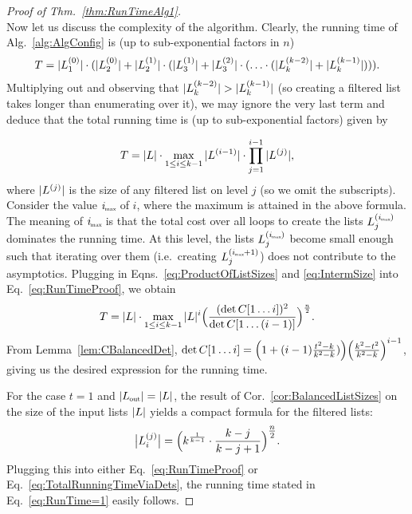 \begin{proof}[Proof of Thm.~\ref{thm:RunTimeAlg1}]
\begin{equation}
  \end{equation}
Now let us discuss the complexity of the algorithm. Clearly, the running time of Alg.~\ref{alg:AlgConfig} is (up to sub-exponential factors in $n$) 
\begin{align*}
   T = |L_1^{(0)}| \cdot (|L_2^{(0)}| + |L_2^{(1)}| \cdot (|L_3^{(1)}| +|L_3^{(2)}| \cdot(\ldots \cdot (|L_k^{(k-2)}| + |L_k^{(k-1)}| ) )).
\end{align*}  
Multiplying out and observing that $\normalabs{L_k^{(k-2)}}>\normalabs{L_k^{(k-1)}}$ (so creating a filtered list takes longer than enumerating over it), we may ignore the very last term and deduce that the total running time is (up to sub-exponential factors) given by

  \begin{equation} \label{eq:RunTimeProof}
  	T =  \left|L\right| \cdot \max\limits_{1 \leq i \leq k-1}  |L^{(i-1)}| \cdot \prod_{j=1}^{i-1} |L^{(j)}|,
  \end{equation}
  where $|L^{(j)}|$ is the size of any filtered list on level $j$ (so we omit the subscripts). Consider the value $\im$ of $i$, where the maximum is attained in the above formula. The meaning of $\im$ is that the total cost over all loops to create the lists $L_j^{(\im)}$ dominates the running time. At this level, the lists $L_j^{(\im)}$ become small enough such that iterating over them (i.e.\ creating $L_j^{(\im+1)}$) does not contribute to the asymptotics. Plugging in Eqns.~\eqref{eq:ProductOfListSizes} and \eqref{eq:IntermSize} into Eq.~\eqref{eq:RunTimeProof}, we obtain
  \vspace{-1ex}
  \begin{equation}\label{eq:TotalRunningTimeViaDets}
    T=\left|L\right|\cdot \max\limits_{1\le i \leq k-1} |L|^i \Bigl( \frac{(\det C[1\ldots i])^2}{\det C[1\ldots (i-1)]}\Bigr)^{\frac{n}{2}}.
  \end{equation}
  From Lemma~\ref{lem:CBalancedDet}, $\det C[1\ldots i] = \Bigl( 1 + (i-1)\frac{t^2-k}{k^2-k})\Bigr) \Bigl( \frac{k^2-t^2}{k^2-k} \Bigr)^{i-1}$, giving us the desired expression for the running time.
  
  For the case $t=1$ and $\normalabs{\Lout} = \normalabs{L}$, the result of Cor.~\ref{cor:BalancedListSizes} on the size of the input lists $\left|L\right|$ yields a compact formula for the filtered lists:
    \vspace{-1ex}
    \begin{equation}\label{eq:IntermSize_t=1}
    	\bigl|L_i^{(j)}\bigr| =  \Bigl( k^{\frac{1}{k-1}} \cdot \frac{k-j}{k-j+1} \Bigr)^{\tfrac{n}{2}}.
    \end{equation}
    Plugging this into either Eq.~\eqref{eq:RunTimeProof} or Eq.~\eqref{eq:TotalRunningTimeViaDets}, the running time stated in Eq.~\eqref{eq:RunTime=1} easily follows.
    

\end{proof}
